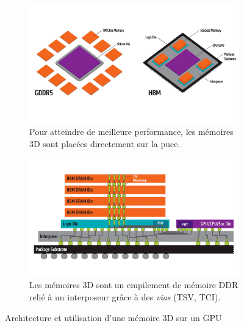         \begin{figure}[t!]
            \centering
            \begin{subfigure}[t]{0.48\textwidth}
                \centering
                \includegraphics[width=\linewidth]{images/edl_hbm_vs_gddr5.png}
                \caption{\label{fig:edl_hbm_vs_gddr5} Pour atteindre de meilleure performance, les mémoires 3D sont placées directement sur la puce.}
            \end{subfigure}\hfill
            \begin{subfigure}[t]{0.48\textwidth}
                \centering
                \includegraphics[width=\linewidth]{images/edl_hbm.png}
                \caption{\label{fig:edl_hbm_precis} Les mémoires 3D sont un empilement de mémoire DDR relié à un interposeur grâce à des \textit{vias} (TSV, TCI).}
            \end{subfigure}
            \caption{\label{fig:edl_hbm}Architecture et utilisation d'une mémoire 3D sur un GPU\protect\footnotemark}
        \end{figure}
        
